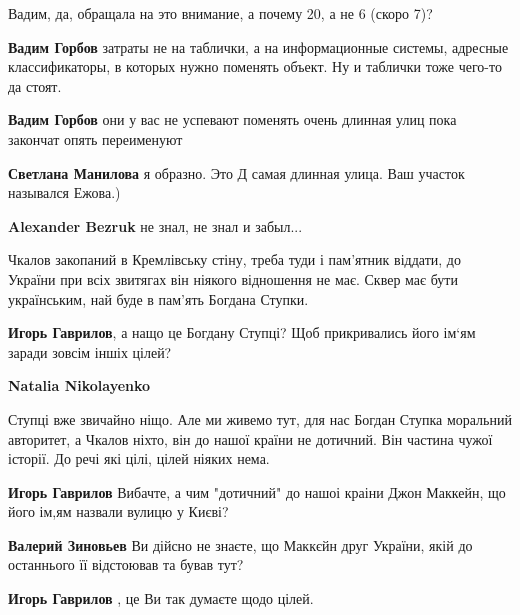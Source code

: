 \begin{itemize}
\begin{itemize}
\begin{itemize} %

Вадим, да, обращала на это внимание, а почему 20, а не 6 (скоро 7)?

\textbf{Вадим Горбов} затраты не на таблички, а на информационные системы, адресные классификаторы, в которых нужно поменять объект.
Ну и таблички тоже чего-то да стоят.

\textbf{Вадим Горбов} они у вас не успевают поменять очень длинная улиц пока закончат опять переименуют

\textbf{Светлана Манилова} я образно. Это Д самая длинная улица. Ваш участок назывался Ежова.)
\end{itemize} %

\textbf{Alexander Bezruk} не знал, не знал и забыл...

\end{itemize} %


Чкалов закопаний в Кремлівську стіну, треба туди і пам'ятник віддати, до України
при всіх звитягах він ніякого відношення не має. Сквер має бути українським, най
буде в пам'ять Богдана Ступки.

\begin{itemize} %
\textbf{Игорь Гаврилов}, а нащо це Богдану Ступці? Щоб
прикривались його ім‘ям заради зовсім іншіх цілей?

\begin{itemize} %
\textbf{Natalia Nikolayenko} 

Ступці вже звичайно ніщо. Але ми живемо тут, для нас Богдан Ступка моральний
авторитет, а Чкалов ніхто, він до нашої країни не дотичний. Він частина чужої
історії. До речі які цілі, цілей ніяких нема.


\textbf{Игорь Гаврилов} Вибачте, а чим "дотичний" до нашоі краіни Джон Маккейн, що його ім,ям назвали вулицю у Києві?

\textbf{Валерий Зиновьев} Ви дійсно не знаєте, що Маккєйн друг України, якій до останнього її відстоював та бував тут?

\textbf{Игорь Гаврилов} , це Ви так думаєте щодо цілей.


\end{itemize}
\end{itemize}
\end{itemize}
